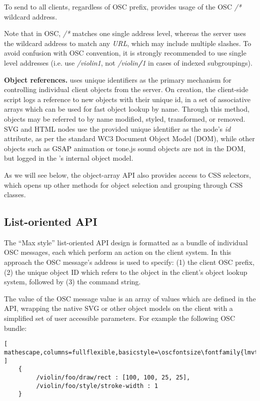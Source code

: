 To send to all clients, regardless of OSC prefix, \drawsocket provides usage of the OSC \textit{/*} wildcard address.

Note that in OSC, \textit{/*} matches one single address level, whereas the \drawsocket server uses the wildcard address to match any \textit{URL}, which may include multiple slashes.
To avoid confusion with OSC convention, it is strongly recommended to use single level addresses (i.e. use \textit{/violin1}, not \textit{/violin\textbf{/}1} in cases of indexed subgroupings).

\medskip
\noindent
\textbf{Object references.} 
\drawsocket uses unique identifiers as the primary mechanism for controlling individual client objects from the server.
On creation, the client-side script logs a reference to new objects with their unique id, in a set of associative arrays which can be used for fast object lookup by name. 
Through this method, objects may be referred to by name modified, styled, transformed, or removed.
SVG and HTML nodes use the provided unique identifier as the node's \textit{id} attribute, as per the standard WC3 Document Object Model (DOM)\cite{Champion:04:DOM}, while other objects such as GSAP animation or tone.js sound objects are not in the DOM, but logged in the \drawsocket's internal object model.

As we will see below, the object-array API also provides access to CSS selectors, which opens up other methods for object selection and grouping through CSS classes.



\subsection{List-oriented API}\label{sec:maxstyle}
The ``Max style'' list-oriented API design is formatted as a bundle of individual OSC messages, each which perform an action on the client system. 
In this approach the OSC message's address is used to specify: (1) the client OSC prefix, (2) the unique object ID which refers to the object in the client's object lookup system, followed by (3) the command string.

The value of the OSC message value is an array of values which are defined in the \drawsocket API, wrapping the native SVG or other object models on the client with a simplified set of user accessible parameters. For example the following OSC bundle:

\begin{lstlisting}[ mathescape,columns=fullflexible,basicstyle=\oscfontsize\fontfamily{lmvtt}\selectfont ]
    {
         /violin/foo/draw/rect : [100, 100, 25, 25],
         /violin/foo/style/stroke-width : 1
    }
\end{lstlisting}

